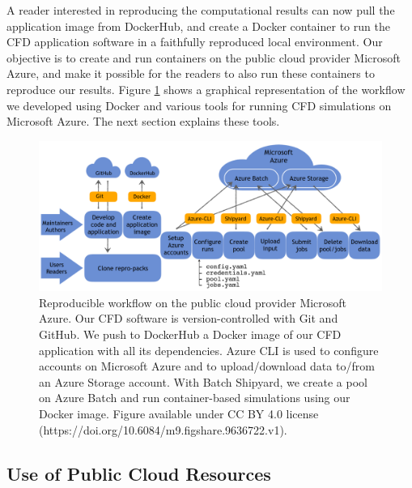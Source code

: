 \documentclass[10pt,journal,compsoc]{IEEEtran}
\begin{document}
\noindent A reader interested in reproducing the computational results can now pull the application image from DockerHub, and create a Docker container to run the CFD application software in a faithfully reproduced local environment.
Our objective is to create and run containers on the public cloud provider Microsoft Azure, and make it possible for the readers to also run these containers to reproduce our results.
Figure \ref{fig:cloud_workflow} shows a graphical representation of the workflow we developed using Docker and various tools for running CFD simulations on Microsoft Azure.
The next section explains these tools.

\begin{figure}[t]
    \centering
    \includegraphics[width=16cm]{cloud_workflow.png}
    \caption{Reproducible workflow on the public cloud provider Microsoft Azure. Our CFD software is version-controlled with Git and GitHub. We push to DockerHub a Docker image of our CFD application with all its dependencies. Azure CLI is used to configure accounts on Microsoft Azure and to upload/download data to/from an Azure Storage account. With Batch Shipyard, we create a pool on Azure Batch and run container-based simulations using our Docker image. Figure available under CC BY 4.0 license (https://doi.org/10.6084/m9.figshare.9636722.v1).}
    \label{fig:cloud_workflow}
\end{figure}

\subsection{Use of Public Cloud Resources}
\end{document}
